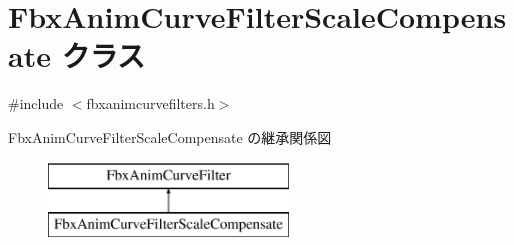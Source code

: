 \hypertarget{class_fbx_anim_curve_filter_scale_compensate}{}\section{Fbx\+Anim\+Curve\+Filter\+Scale\+Compensate クラス}
\label{class_fbx_anim_curve_filter_scale_compensate}


{\ttfamily \#include $<$fbxanimcurvefilters.\+h$>$}

Fbx\+Anim\+Curve\+Filter\+Scale\+Compensate の継承関係図\begin{figure}[H]
\begin{center}
\leavevmode
\includegraphics[height=2.000000cm]{class_fbx_anim_curve_filter_scale_compensate}
\end{center}
\end{figure}
